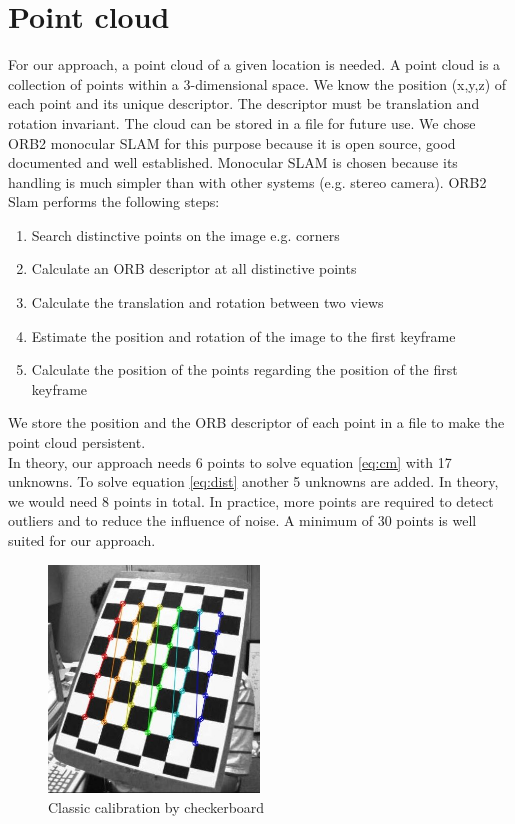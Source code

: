 \documentclass[conference,nofonttune]{IEEEtran}
\begin{document}
\section{Point cloud}
For our approach, a point cloud of a given location is needed. A point cloud is a collection of points within a 3-dimensional space. We know the position (x,y,z) of each point and its unique descriptor. The descriptor must be translation and rotation invariant. The cloud can be stored in a file for future use. We chose ORB2 monocular SLAM \cite{orbslam} for this purpose because it is open source, good documented and well established. Monocular SLAM is chosen because its handling is much simpler than with other systems (e.g. stereo camera). ORB2 Slam performs the following steps:
\begin{enumerate}
\item Search distinctive points on the image e.g. corners
\item Calculate an ORB descriptor at all distinctive points
\item Calculate the translation and rotation between two views
\item Estimate the position and rotation of the image to the first keyframe
\item Calculate the position of the points regarding the position of the first keyframe
\end{enumerate}

We store the position and the ORB descriptor of each point in a file to make the point cloud persistent.\\
In theory, our approach needs 6 points to solve equation \ref{eq:cm} with 17 unknowns. To solve equation \ref{eq:dist} another 5 unknowns are added. In theory, we would need 8 points in total. In practice, more points are required to detect outliers and to reduce the influence of noise. A minimum of 30 points is well suited for our approach.

\begin{figure}
  \includegraphics[width=0.5\textwidth]{img/checkerboard.jpg}
\caption{Classic calibration by checkerboard}\label{fig:checkerboard}
\end{figure}
\end{document}
